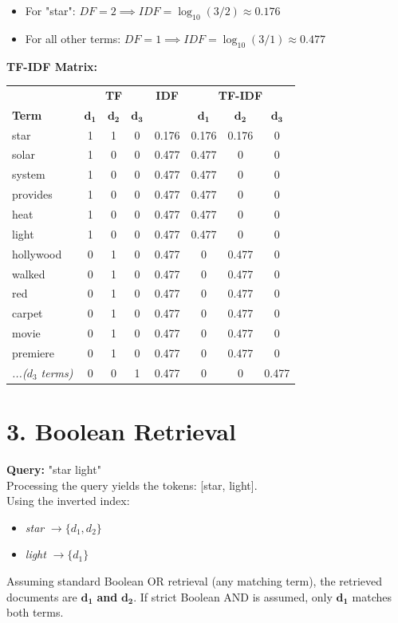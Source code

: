 \documentclass{article}
\begin{document}
\begin{itemize}
    \item For "star": $DF = 2 \implies IDF = \log_{10}(3/2) \approx 0.176$
    \item For all other terms: $DF = 1 \implies IDF = \log_{10}(3/1) \approx 0.477$
\end{itemize}

\textbf{TF-IDF Matrix:}
\begin{center}
\begin{tabular}{l ccc | c | ccc}
\toprule
& \multicolumn{3}{c}{\textbf{TF}} & \textbf{IDF} & \multicolumn{3}{c}{\textbf{TF-IDF}} \\
\textbf{Term} & $\mathbf{d_1}$ & $\mathbf{d_2}$ & $\mathbf{d_3}$ & & $\mathbf{d_1}$ & $\mathbf{d_2}$ & $\mathbf{d_3}$ \\
\midrule
star & 1 & 1 & 0 & 0.176 & 0.176 & 0.176 & 0 \\
solar & 1 & 0 & 0 & 0.477 & 0.477 & 0 & 0 \\
system & 1 & 0 & 0 & 0.477 & 0.477 & 0 & 0 \\
provides & 1 & 0 & 0 & 0.477 & 0.477 & 0 & 0 \\
heat & 1 & 0 & 0 & 0.477 & 0.477 & 0 & 0 \\
light & 1 & 0 & 0 & 0.477 & 0.477 & 0 & 0 \\
hollywood & 0 & 1 & 0 & 0.477 & 0 & 0.477 & 0 \\
walked & 0 & 1 & 0 & 0.477 & 0 & 0.477 & 0 \\
red & 0 & 1 & 0 & 0.477 & 0 & 0.477 & 0 \\
carpet & 0 & 1 & 0 & 0.477 & 0 & 0.477 & 0 \\
movie & 0 & 1 & 0 & 0.477 & 0 & 0.477 & 0 \\
premiere & 0 & 1 & 0 & 0.477 & 0 & 0.477 & 0 \\
\textit{...($d_3$ terms)} & 0 & 0 & 1 & 0.477 & 0 & 0 & 0.477 \\
\bottomrule
\end{tabular}
\end{center}

\section*{3. Boolean Retrieval}
\textbf{Query:} "star light" \\
Processing the query yields the tokens: [star, light]. \\
Using the inverted index:
\begin{itemize}
    \item \textit{star} $\rightarrow \{d_1, d_2\}$
    \item \textit{light} $\rightarrow \{d_1\}$
\end{itemize}
Assuming standard Boolean OR retrieval (any matching term), the retrieved documents are $\mathbf{d_1}$ \textbf{and} $\mathbf{d_2}$. If strict Boolean AND is assumed, only $\mathbf{d_1}$ matches both terms. 
\end{document}
